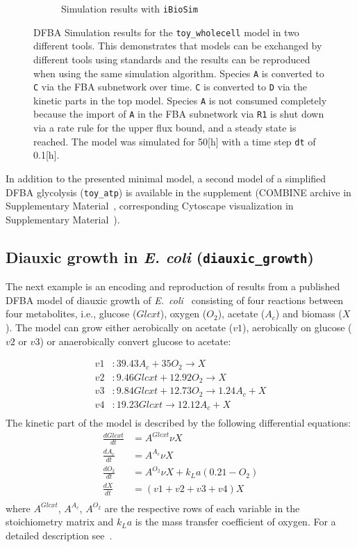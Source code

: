 \documentclass{bioinfo}
\begin{document}
\begin{figure}[!t]
\begin{subfigure}[t]{0.5\textwidth}
	\caption{Simulation results with \texttt{iBioSim}}\label{fig:biosim_toy_results}
\end{subfigure}
\caption{DFBA Simulation results for the \texttt{toy\_wholecell} model in two different tools. This demonstrates that models can be exchanged by different tools using standards and the results can be reproduced when using the same simulation algorithm. Species \texttt{A} is converted to \texttt{C} via the FBA subnetwork over time. \texttt{C} is converted to \texttt{D} via the kinetic parts in the top model. Species \texttt{A} is not consumed completely because the import of \texttt{A} in the FBA subnetwork via \texttt{R1} is shut down via a rate rule for the upper flux bound, and a steady state is reached. The model was simulated for 50[h] with a time step \texttt{dt} of 0.1[h].}
\label{fig:toy_results}
\end{figure}

In addition to the presented minimal model, a second model of a simplified DFBA glycolysis (\texttt{toy\_atp}) is available in the supplement (COMBINE archive in Supplementary Material~, corresponding Cytoscape visualization in Supplementary Material~).

\subsection{Diauxic growth in \emph{E. coli} (\texttt{diauxic\_growth})}
The next example is an encoding and reproduction of results from a published DFBA model of diauxic growth of \emph{E.~coli~}\citep{DFBA_ECOLI} consisting of four reactions between four metabolites, i.e., glucose ($Glcxt$), oxygen ($O_2$), acetate ($A_c$) and biomass ($X$). The model can grow either aerobically on acetate ($v1$), aerobically on glucose ($v2$ or $v3$) or anaerobically convert glucose to acetate:

\begin{align*}
v1&: 39.43 A_c + 35 O_2 \rightarrow X \\
v2&:  9.46 Glcxt + 12.92 O_2 \rightarrow X \\
v3&: 9.84 Glcxt + 12.73 O_2 \rightarrow 1.24 A_c + X \\
v4&: 19.23 Glcxt \rightarrow 12.12 A_c + X \\
\end{align*}
The kinetic part of the model is described by the following differential equations:
\begin{align*}
\frac{d Glcxt}{dt} &= A^{Glcxt} \nu X \\
\frac{d A_c}{dt} &= A^{A_c} \nu X \\
\frac{d O_2}{dt} &= A^{O_2} \nu X + k_L a(0.21 - O_2) \\
\frac{d X}{dt} &= (v1 + v2 + v3 + v4) X\\
\end{align*}
where $A^{Glcxt}$, $A^{A_c}$, $A^{O_2}$ are the respective rows of each variable in the stoichiometry matrix and $k_L a$ is the mass transfer coefficient of oxygen. For a detailed description see~\citep{DFBA_ECOLI}. 
\end{document}
